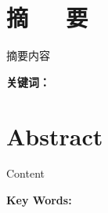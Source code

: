 \chapter*{摘~~~要}

摘要内容

\vspace{0.5\ccwd}

\textbf{关键词：}

\chapter*{\textbf{Abstract}}

Content

\vspace{0.5\ccwd}

\textbf{Key Words: }
